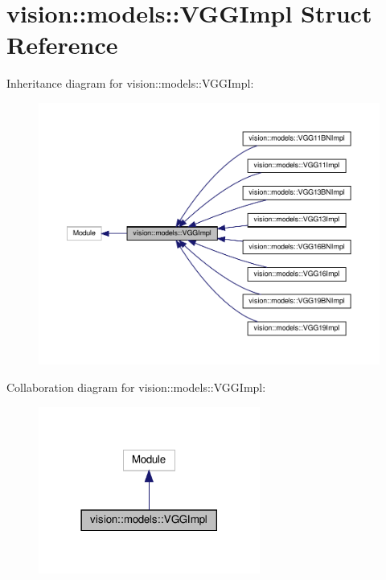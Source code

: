 \hypertarget{structvision_1_1models_1_1VGGImpl}{}\section{vision\+:\+:models\+:\+:V\+G\+G\+Impl Struct Reference}
\label{structvision_1_1models_1_1VGGImpl}


Inheritance diagram for vision\+:\+:models\+:\+:V\+G\+G\+Impl\+:
\nopagebreak
\begin{figure}[H]
\begin{center}
\leavevmode
\includegraphics[width=350pt]{structvision_1_1models_1_1VGGImpl__inherit__graph}
\end{center}
\end{figure}


Collaboration diagram for vision\+:\+:models\+:\+:V\+G\+G\+Impl\+:
\nopagebreak
\begin{figure}[H]
\begin{center}
\leavevmode
\includegraphics[width=206pt]{structvision_1_1models_1_1VGGImpl__coll__graph}
\end{center}
\end{figure}
